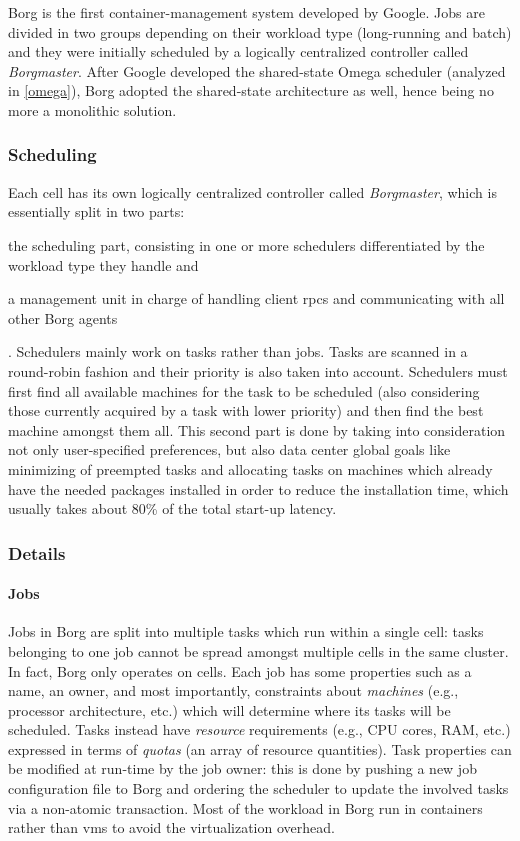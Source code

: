 Borg \cite{borg} is the first container-management system developed by Google.
Jobs are divided in two groups depending on their workload type (long-running and batch) and they were initially scheduled by a logically centralized controller called \textit{Borgmaster}.
After Google developed the shared-state Omega \cite{omega} scheduler (analyzed in \autoref{omega}), Borg \cite{borg} adopted the shared-state architecture as well, hence being no more a monolithic solution.

\subsubsection{Scheduling}
Each cell has its own logically centralized controller called \textit{Borgmaster}, which is essentially split in two parts:
\begin{mylist}
    \item the scheduling part, consisting in one or more schedulers differentiated by the workload type they handle and
    \item a management unit in charge of handling client \glspl{rpc} and communicating with all other Borg \cite{borg} agents
\end{mylist}.
Schedulers mainly work on tasks rather than jobs.
Tasks are scanned in a round-robin fashion and their priority is also taken into account.
Schedulers must first find all available machines for the task to be scheduled (also considering those currently acquired by a task with lower priority) and then find the best machine amongst them all.
This second part is done by taking into consideration not only user-specified preferences, but also data center global goals like minimizing of preempted tasks and allocating tasks on machines which already have the needed packages installed in order to reduce the installation time, which usually takes about 80\% of the total start-up latency.

\subsubsection{Details}
\paragraph{Jobs}
Jobs in Borg \cite{borg} are split into multiple tasks which run within a single cell: tasks belonging to one job cannot be spread amongst multiple cells in the same cluster.
In fact, Borg \cite{borg} only operates on cells.
Each job has some properties such as a name, an owner, and most importantly, constraints about \textit{machines} (e.g., processor architecture, etc.) which will determine where its tasks will be scheduled.
Tasks instead have \textit{resource} requirements (e.g., CPU cores, RAM, etc.) expressed in terms of \textit{quotas} (an array of resource quantities).
Task properties can be modified at run-time by the job owner: this is done by pushing a new job configuration file to Borg \cite{borg} and ordering the scheduler to update the involved tasks via a non-atomic transaction.
Most of the workload in Borg \cite{borg} run in containers rather than \glspl{vm} to avoid the virtualization overhead.
